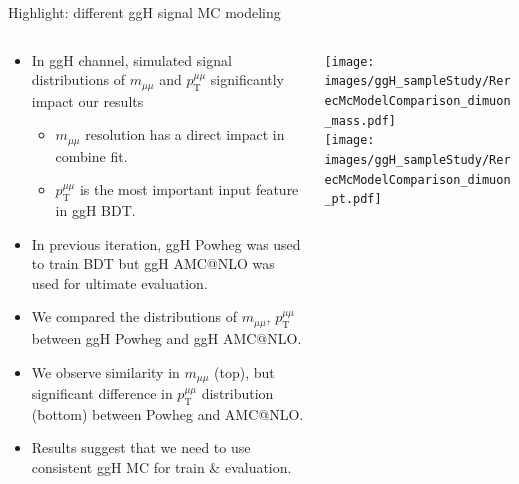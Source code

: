 \documentclass[dvipsnames,aspectratio=169]{beamer}
\begin{document}



\begin{frame}{Highlight: different ggH signal MC modeling}
    \begin{columns}
        \begin{column}{0.7\textwidth}
        {\fontsize{10pt}{12pt}\selectfont 
            \begin{itemize}
            \item In ggH channel, simulated signal distributions of $m_{\mu\mu}$ and $p_\mathrm{T}^{\mu\mu}$ significantly impact our results
            \begin{itemize}
            \item $m_{\mu\mu}$ resolution has a direct impact in combine fit.
            \item $p_\mathrm{T}^{\mu\mu}$ is the most important input feature in ggH BDT.
            \end{itemize}
            \item In previous iteration, ggH Powheg was used to train BDT but ggH AMC@NLO was used for ultimate evaluation.
            \item We compared the distributions of $m_{\mu\mu}$, $p_\mathrm{T}^{\mu\mu}$ between ggH Powheg and ggH AMC@NLO.
            \item We observe similarity in $m_{\mu\mu}$ (top), but significant difference in $p_\mathrm{T}^{\mu\mu}$ distribution (bottom) between Powheg and AMC@NLO.
            \item Results suggest that we need to use consistent ggH MC for train \& evaluation.
            \end{itemize}
        }
        \end{column}
        
        \begin{column}{0.3\textwidth}
            \centering
            {\texttt{[image: images/ggH\_sampleStudy/RerecMcModelComparison\_dimuon\_mass.pdf]}}\\
            {\texttt{[image: images/ggH\_sampleStudy/RerecMcModelComparison\_dimuon\_pt.pdf]}}
        \end{column}
    \end{columns}
\end{frame}
\end{document}
